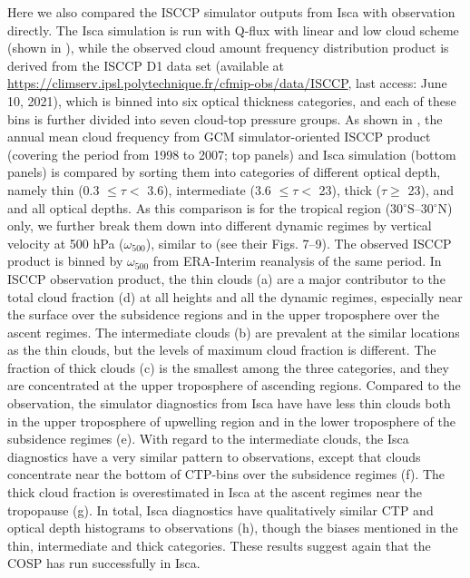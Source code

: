Here we also compared the ISCCP simulator outputs from Isca with observation directly. The Isca simulation is run with Q-flux with linear and low cloud scheme (shown in ), while the observed cloud amount frequency distribution product is derived from the ISCCP D1 data set \citep{Rossow1999advances} (available at \url{https://climserv.ipsl.polytechnique.fr/cfmip-obs/data/ISCCP}, last access: June 10, 2021), which is binned into six optical thickness categories, and each of these bins is further divided into seven cloud-top pressure groups. As shown in , the annual mean cloud frequency from  GCM simulator-oriented ISCCP product (covering the period from 1998 to 2007; top panels) and Isca simulation (bottom panels) is compared by sorting them into categories of different optical depth, namely thin (0.3 $\le\tau<$ 3.6), intermediate (3.6 $\le\tau<$ 23), thick ($\tau\ge$ 23), and and all optical depths. As this comparison is for the tropical region (30$^\circ$S--30$^\circ$N) only, we further break them down into different dynamic regimes by vertical velocity at 500 hPa ($\omega_{500}$), similar to \cite{Wyant2006comparison} (see their Figs. 7--9). The observed ISCCP product is binned by $\omega_{500}$ from ERA-Interim reanalysis of the same period. In ISCCP observation product, the thin clouds (a) are a major contributor to the total cloud fraction (d) at all heights and all the dynamic regimes, especially near the surface over the subsidence regions and in the upper troposphere over the ascent regimes. The intermediate clouds (b) are prevalent at the similar locations as the thin clouds, but the levels of maximum cloud fraction is different. The fraction of thick clouds (c) is the smallest among the three categories, and they are concentrated at the upper troposphere of ascending regions. Compared to the observation, the simulator diagnostics from Isca have have less thin clouds both in the upper troposphere of upwelling region and in the lower troposphere of the subsidence regimes (e). With regard to the intermediate clouds, the Isca diagnostics have a very similar pattern to observations, except that clouds concentrate near the bottom of CTP-bins over the subsidence regimes (f). The thick cloud fraction is overestimated in Isca at the ascent regimes near the tropopause (g). In total, Isca diagnostics have qualitatively similar CTP and optical depth histograms to observations (h), though the biases mentioned in the thin, intermediate and thick categories. These results suggest again that the COSP has run successfully in Isca. 


